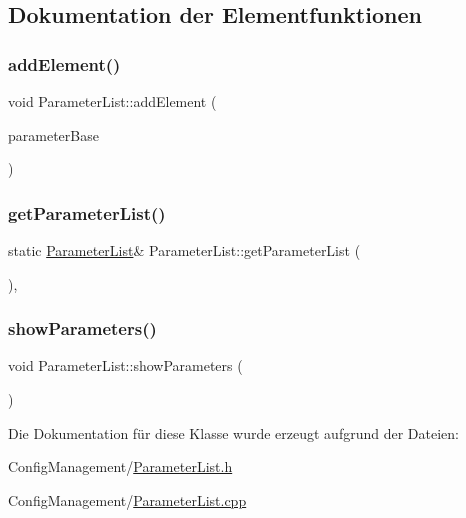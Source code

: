 \subsection{Dokumentation der Elementfunktionen}
\hypertarget{class_parameter_list_a4f4ede7252ae20641befa93cd6c316b3}{}\label{class_parameter_list_a4f4ede7252ae20641befa93cd6c316b3} 
\subsubsection{\texorpdfstring{add\+Element()}{addElement()}}
{\footnotesize\ttfamily void Parameter\+List\+::add\+Element (\begin{DoxyParamCaption}\item[{\hyperlink{class_parameter_base}{Parameter\+Base} $\ast$}]{parameter\+Base }\end{DoxyParamCaption})}

\hypertarget{class_parameter_list_ae34f5f9c5a2c8cf9ea216cc733a0a68b}{}\label{class_parameter_list_ae34f5f9c5a2c8cf9ea216cc733a0a68b} 
\subsubsection{\texorpdfstring{get\+Parameter\+List()}{getParameterList()}}
{\footnotesize\ttfamily static \hyperlink{class_parameter_list}{Parameter\+List}\& Parameter\+List\+::get\+Parameter\+List (\begin{DoxyParamCaption}{ }\end{DoxyParamCaption})\hspace{0.3cm}{\ttfamily [inline]}, {\ttfamily [static]}}

\hypertarget{class_parameter_list_a8402f42970e27ac8618733f507178788}{}\label{class_parameter_list_a8402f42970e27ac8618733f507178788} 
\subsubsection{\texorpdfstring{show\+Parameters()}{showParameters()}}
{\footnotesize\ttfamily void Parameter\+List\+::show\+Parameters (\begin{DoxyParamCaption}{ }\end{DoxyParamCaption})}



Die Dokumentation für diese Klasse wurde erzeugt aufgrund der Dateien\+:\begin{DoxyCompactItemize}
\item 
Config\+Management/\hyperlink{_parameter_list_8h}{Parameter\+List.\+h}\item 
Config\+Management/\hyperlink{_parameter_list_8cpp}{Parameter\+List.\+cpp}\end{DoxyCompactItemize}
